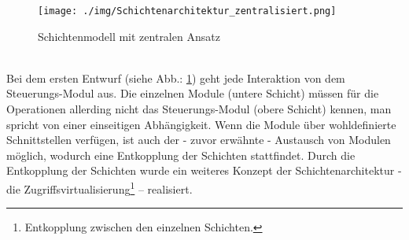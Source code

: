 \documentclass[Bachelorarbeit.tex]{subfiles}
\begin{document}
\begin{figure} [h]
\texttt{[image: ./img/Schichtenarchitektur\_zentralisiert.png]}
\caption{Schichtenmodell mit zentralen Ansatz}
\label{pic:schicht_zentral}
\end{figure}
\mbox{}\\
Bei dem ersten Entwurf (siehe Abb.: \ref{pic:schicht_zentral}) geht jede Interaktion von dem Steuerungs-Modul aus. Die einzelnen Module (untere Schicht) müssen für die Operationen allerding nicht das Steuerungs-Modul (obere Schicht) kennen, man spricht von einer einseitigen 
Abhängigkeit. Wenn die Module über wohldefinierte Schnittstellen verfügen, ist auch 
der - zuvor erwähnte - Austausch von Modulen möglich, wodurch eine Entkopplung 
der Schichten stattfindet. Durch die Entkopplung der Schichten wurde ein weiteres
Konzept der Schichtenarchitektur - die Zugriffsvirtualisierung\footnote{Entkopplung zwischen den einzelnen Schichten.} – realisiert.
\end{document}
